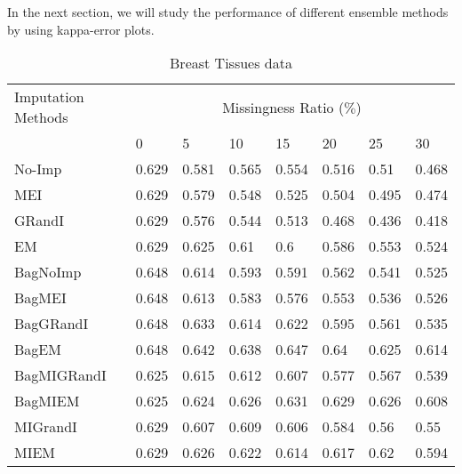\documentclass{iosart2c}
\begin{document}
In the next section, we will study the performance of different ensemble methods by using kappa-error plots.

\begin{table*}[htb]
\centering
\caption{Breast Tissues data}
\label{tab:breast}
    \begin{tabular}{|p{25mm}|l|l|l|l|l|l|l|} \hline
     Imputation Methods    & \multicolumn{7}{c|}{Missingness Ratio ($\%$)} \\ \cline{2-8}
                           &  0 & 5 & 10 & 15 & 20 & 25 & 30 \\ \hline
No-Imp & 0.629 & 0.581 & 0.565 & 0.554 & 0.516 & 0.51 & 0.468 \\ \hline
MEI & 0.629 & 0.579 & 0.548 & 0.525 & 0.504 & 0.495 & 0.474 \\ \hline
GRandI & 0.629 & 0.576 & 0.544 & 0.513 & 0.468 & 0.436 & 0.418 \\ \hline
EM & 0.629 & 0.625 & 0.61 & 0.6 & 0.586 & 0.553 & 0.524 \\ \hline \hline
BagNoImp & 0.648 & 0.614 & 0.593 & 0.591 & 0.562 & 0.541 & 0.525 \\ \hline
BagMEI & 0.648 & 0.613 & 0.583 & 0.576 & 0.553 & 0.536 & 0.526 \\ \hline
BagGRandI & 0.648 & 0.633 & 0.614 & 0.622 & 0.595 & 0.561 & 0.535 \\ \hline
BagEM & 0.648 & 0.642 & 0.638 & 0.647 & 0.64 & 0.625 & 0.614 \\ \hline \hline
BagMIGRandI & 0.625 & 0.615 & 0.612 & 0.607 & 0.577 & 0.567 & 0.539 \\ \hline
BagMIEM & 0.625 & 0.624 & 0.626 & 0.631 & 0.629 & 0.626 & 0.608 \\ \hline \hline
MIGrandI & 0.629 & 0.607 & 0.609 & 0.606 & 0.584 & 0.56 & 0.55 \\ \hline
MIEM & 0.629 & 0.626 & 0.622 & 0.614 & 0.617 & 0.62 & 0.594 \\ \hline
\end{tabular}
\end{table*}
\end{document}
